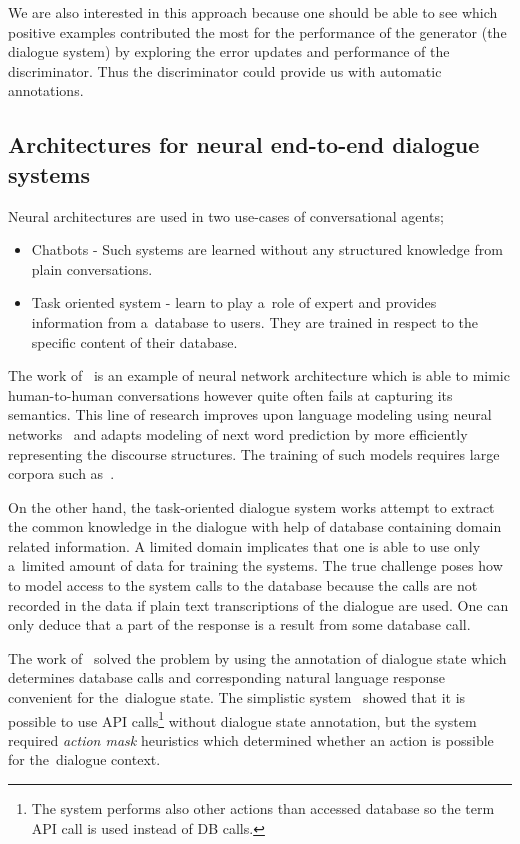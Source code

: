 \documentclass[11pt]{article}
\begin{document}
We are also interested in this approach because one should be able to see which positive examples contributed the most for the performance of the generator (the dialogue system) by exploring the error updates and performance of the discriminator.
Thus the discriminator could provide us with automatic annotations. 

\subsection{Architectures for neural end-to-end dialogue systems}
\label{sub:nn_architectures}
Neural architectures are used in two use-cases of conversational agents;
\begin{itemize}
    \item Chatbots - Such systems are learned without any structured knowledge from plain conversations.
    \item Task oriented system - learn to play a~role of expert and provides information from a~database to users.
        They are trained in respect to the specific content of their database.
\end{itemize}

The work of~\cite{serban_multiresolution_2016} is an example of neural network architecture which is able to mimic human-to-human conversations however quite often fails at capturing its semantics.
This line of research improves upon language modeling using neural networks~\cite{mikolov_efficient_2013} and adapts modeling of next word prediction by more efficiently representing the discourse structures.
The training of such models requires large corpora such as~\cite{lowe_ubuntu_2015}. 

On the other hand, the task-oriented dialogue system works attempt to extract the common knowledge in the dialogue with help of database containing domain related information.
A limited domain implicates that one is able to use only a~limited amount of data for training the systems.
The true challenge poses how to model access to the system calls to the database because the calls are not recorded in the data if plain text transcriptions of the dialogue are used.
One can only deduce that a part of the response is a result from some database call.

The work of~\cite{wen_networkbased_2016} solved the problem by using the annotation of dialogue state which determines database calls and corresponding natural language response convenient for the~dialogue state. 
The simplistic system~\cite{williams2016end} showed that it is possible to use API calls\footnote{The system performs also other actions than accessed database so the term API call is used instead of DB calls.} without dialogue state annotation, but the system required {\it action mask} heuristics which determined whether an action is possible for the~dialogue context.
\end{document}
